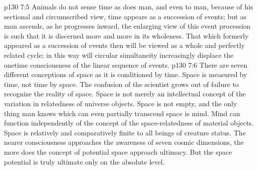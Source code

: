 \vs p130 7:5 Animals do not sense time as does man, and even to man, because of his sectional and circumscribed view, time appears as a succession of events; but as man ascends, as he progresses inward, the enlarging view of this event procession is such that it is discerned more and more in its wholeness. That which formerly appeared as a succession of events then will be viewed as a whole and perfectly related cycle; in this way will circular simultaneity increasingly displace the onetime consciousness of the linear sequence of events.
\vs p130 7:6 There are seven different conceptions of space as it is conditioned by time. Space is measured by time, not time by space. The confusion of the scientist grows out of failure to recognize the reality of space. Space is not merely an intellectual concept of the variation in relatedness of universe objects. Space is not empty, and the only thing man knows which can even partially transcend space is mind. Mind can function independently of the concept of the space\hyp{}relatedness of material objects. Space is relatively and comparatively finite to all beings of creature status. The nearer consciousness approaches the awareness of seven cosmic dimensions, the more does the concept of potential space approach ultimacy. But the space potential is truly ultimate only on the absolute level.
